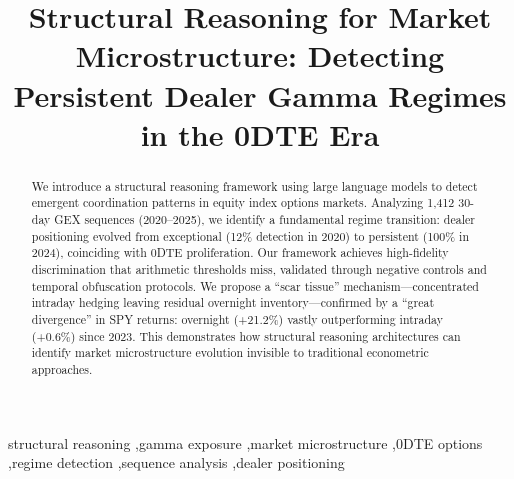 \documentclass[preprint,12pt,authoryear]{elsarticle}
\begin{document}
\begin{frontmatter}

\title{Structural Reasoning for Market Microstructure: Detecting Persistent Dealer Gamma Regimes in the 0DTE Era}


\begin{abstract}
We introduce a structural reasoning framework using large language models to detect emergent coordination patterns in equity index options markets. Analyzing 1,412 30-day GEX sequences (2020--2025), we identify a fundamental regime transition: dealer positioning evolved from exceptional (12\% detection in 2020) to persistent (100\% in 2024), coinciding with 0DTE proliferation. Our framework achieves high-fidelity discrimination that arithmetic thresholds miss, validated through negative controls and temporal obfuscation protocols. We propose a ``scar tissue'' mechanism---concentrated intraday hedging leaving residual overnight inventory---confirmed by a ``great divergence'' in SPY returns: overnight (+21.2\%) vastly outperforming intraday (+0.6\%) since 2023. This demonstrates how structural reasoning architectures can identify market microstructure evolution invisible to traditional econometric approaches.
\end{abstract}

\begin{keyword}
structural reasoning \sep gamma exposure \sep market microstructure \sep 0DTE options \sep regime detection \sep sequence analysis \sep dealer positioning
\end{keyword}

\end{frontmatter}






\FloatBarrier
\end{document}
